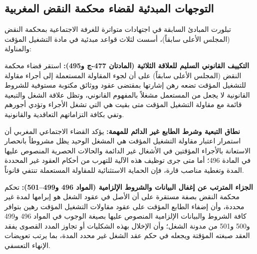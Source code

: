 \subsection{التوجهات المبدئية لقضاء محكمة النقض المغربية}
تبلورت المبادئ السابقة في اجتهادات متواترة للغرفة الاجتماعية بمحكمة النقض (المجلس الأعلى سابقاً)، أسست لثلاث قواعد مبدئية في مادة التشغيل المؤقت والمناولة:

\begin{tcolorbox}[colback=lightgray, colframe=maincolor, arc=5pt,
    title={\textbf{القاعدة الأولى: حصر صفة المستعمل عند التقيد بضوابط التشغيل المؤقت}}]
\textbf{التكييف القانوني السليم للعلاقة الثلاثية (المادتان \textenglish{477-ج} و\textenglish{495}):}
استقر قضاء محكمة النقض (المجلس الأعلى سابقاً) على أن لجوء المقاولة المستعملة إلى أجراء مقاولة للتشغيل المؤقت تضعه رهن إشارتها بمقتضى عقود ووثائق مكتوبة مستوفية للشروط القانونية لا يجعل من المستعمل مشغلاً بالمفهوم القانوني، وتظل علاقة الشغل والتبعية قائمة مع مقاولة التشغيل المؤقت متى بقيت هي التي تشغل الأجراء وتؤدي أجورهم وتفي بكافة التزاماتهم التعاقدية والقانونية.
\end{tcolorbox}

\begin{tcolorbox}[colback=lightgray, colframe=sectioncolor, arc=5pt,
    title={\textbf{القاعدة الثانية: انتفاء الحماية المؤقتة في حال التحايل أو خرق المادة \textenglish{496}}}]
\textbf{نطاق التبعية وشرط الطابع غير الدائم للمهمة:}
يؤكد القضاء الاجتماعي المغربي أن استمرار اعتبار مقاولة التشغيل المؤقت هي المشغل الوحيد يظل مشروطاً بانحصار الاستعانة بالأجراء المؤقتين في الأشغال غير الدائمة والحالات الحصرية المنصوص عليها في المادة \textenglish{496}؛ أما متى جرى توظيف هذه الآلية للتهرب من أحكام العقود غير المحددة المدة وتغطية مناصب قارة، فإن الحماية الاستثنائية للمقاولة المستعملة تنتفي قانوناً.
\end{tcolorbox}

\begin{tcolorbox}[colback=lightgray, colframe=accentcolor, arc=5pt,
    title={\textbf{القاعدة الثالثة: فقدان الصفة المؤقتة وإعادة التكييف إلى عقد غير محدد المدة (\textenglish{CDI})}}]
\textbf{الجزاء المترتب عن إغفال البيانات والشروط الإلزامية (المواد \textenglish{496} و\textenglish{499}--\textenglish{501}):}
تحكم محكمة النقض بصفة مستقرة على أن الأصل في عقود الشغل هو إبرامها لمدة غير محددة، وأن إضفاء الطابع المؤقت على عقود مقاولات التشغيل المؤقت رهين بتوافر كافة الشروط والبيانات الإلزامية المنصوص عليها بصيغة الوجوب في المواد \textenglish{496} و\textenglish{499} و\textenglish{500} و\textenglish{501} من مدونة الشغل؛ وأن الإخلال بهذه الشكليات أو تجاوز المدد القصوى يفقد العقد صبغته المؤقتة ويجعله في حكم عقد الشغل غير محدد المدة، بما يرتب تعويضات الإنهاء التعسفي.
\end{tcolorbox}

